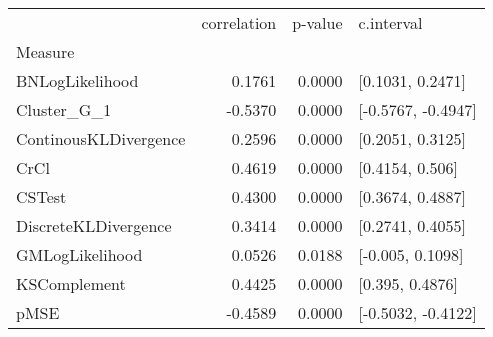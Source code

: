 \begin{tabular}{lrrl}
\toprule
{} &  correlation &  p-value &          c.interval \\
Measure               &              &          &                     \\
\midrule
BNLogLikelihood       &       0.1761 &   0.0000 &    [0.1031, 0.2471] \\
Cluster\_G\_1           &      -0.5370 &   0.0000 &  [-0.5767, -0.4947] \\
ContinousKLDivergence &       0.2596 &   0.0000 &    [0.2051, 0.3125] \\
CrCl                  &       0.4619 &   0.0000 &     [0.4154, 0.506] \\
CSTest                &       0.4300 &   0.0000 &    [0.3674, 0.4887] \\
DiscreteKLDivergence  &       0.3414 &   0.0000 &    [0.2741, 0.4055] \\
GMLogLikelihood       &       0.0526 &   0.0188 &    [-0.005, 0.1098] \\
KSComplement          &       0.4425 &   0.0000 &     [0.395, 0.4876] \\
pMSE                  &      -0.4589 &   0.0000 &  [-0.5032, -0.4122] \\
\bottomrule
\end{tabular}
